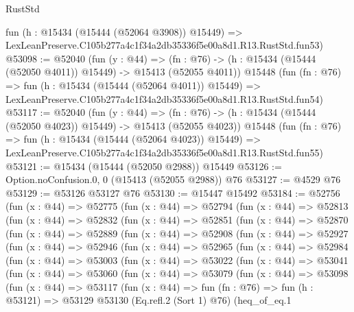 \begin{lexlean}{RustStd}
\begin{coremodule}
    fun (h : @15434 (@15444 (@52064 @3908)) @15449) =>
    LexLeanPreserve.C105b277a4c1f34a2db35336f5e00a8d1.R13.RustStd.fun53)
@53098 := @52040
    (fun (y : @44) =>
    (fn : @76) -> (h : @15434 (@15444 (@52050 @4011)) @15449) -> @15413 (@52055 @4011))
    @15448
    (fun (fn : @76) =>
    fun (h : @15434 (@15444 (@52064 @4011)) @15449) =>
    LexLeanPreserve.C105b277a4c1f34a2db35336f5e00a8d1.R13.RustStd.fun54)
@53117 := @52040
    (fun (y : @44) =>
    (fn : @76) -> (h : @15434 (@15444 (@52050 @4023)) @15449) -> @15413 (@52055 @4023))
    @15448
    (fun (fn : @76) =>
    fun (h : @15434 (@15444 (@52064 @4023)) @15449) =>
    LexLeanPreserve.C105b277a4c1f34a2db35336f5e00a8d1.R13.RustStd.fun55)
@53121 := @15434 (@15444 (@52050 @2988)) @15449
@53126 := Option.noConfusion.{0, 0} (@15413 (@52055 @2988)) @76
@53127 := @4529 @76
@53129 := @53126 @53127 @76
@53130 := @15447 @15492
@53184 := @52756
    (fun (x : @44) =>
    @52775
      (fun (x : @44) =>
      @52794
        (fun (x : @44) =>
        @52813
          (fun (x : @44) =>
          @52832
            (fun (x : @44) =>
            @52851
              (fun (x : @44) =>
              @52870
                (fun (x : @44) =>
                @52889
                  (fun (x : @44) =>
                  @52908
                    (fun (x : @44) =>
                    @52927
                      (fun (x : @44) =>
                      @52946
                        (fun (x : @44) =>
                        @52965
                          (fun (x : @44) =>
                          @52984
                            (fun (x : @44) =>
                            @53003
                              (fun (x : @44) =>
                              @53022
                                (fun (x : @44) =>
                                @53041
                                  (fun (x : @44) =>
                                  @53060
                                    (fun (x : @44) =>
                                    @53079
                                      (fun (x : @44) =>
                                      @53098
                                        (fun (x : @44) =>
                                        @53117
                                          (fun (x : @44) =>
                                          fun (fn : @76) =>
                                          fun (h : @53121) =>
                                          @53129
                                            @53130
                                            (Eq.refl.{2} (Sort 1) @76)
                                            (heq_of_eq.{1}

\end{coremodule}
\end{lexlean}
